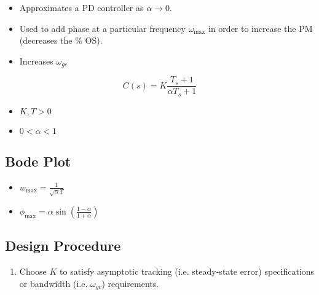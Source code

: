 \begin{motivation}
    \begin{itemize}
        \item Approximates a PD controller as $\alpha \to 0$.
        \item Used to add phase at a particular frequency $\omega_{\max}$ in order to increase the PM (decreases the \% OS).
        \item Increases $\omega_{gc}$
    \end{itemize}
\end{motivation}

\begin{definition}
    \begin{equation}
        C(s) = K \frac{T_s + 1}{\alpha T_s + 1}
    \end{equation}
    \begin{itemize}
        \item $K, T > 0$
        \item $0 < \alpha < 1$
    \end{itemize}
\end{definition}

\subsection{Bode Plot}
\begin{notes}
    \begin{itemize}
        \item $w_{\max} = \frac{1}{\sqrt{\alpha} T}$
        \item $\phi_{\max} = \alpha \sin \left(\frac{1-\alpha}{1+\alpha}\right)$
    \end{itemize}
\end{notes}

\subsection{Design Procedure}
\begin{process}
    \begin{enumerate}
        \item Choose $K$ to satisfy asymptotic tracking (i.e. steady-state error) specifications or bandwidth (i.e. $\omega_{gc}$) requirements.
    \end{enumerate}
\end{process}


